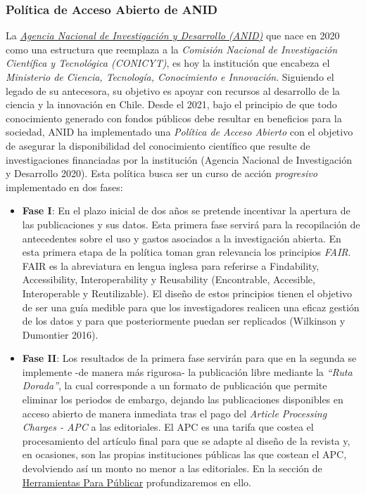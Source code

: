 \documentclass[
  spanish,
  letterpaper,
  DIV=11,
  numbers=noendperiod]{scrreprt}
\begin{document}
\subsubsection*{\texorpdfstring{\textbf{Política de Acceso Abierto de
ANID}}{Política de Acceso Abierto de ANID}}\label{poluxedtica-de-acceso-abierto-de-anid}

La \href{https://www.anid.cl/}{\emph{Agencia Nacional de Investigación y
Desarrollo (ANID)}} que nace en 2020 como una estructura que reemplaza a
la \emph{Comisión Nacional de Investigación Científica y Tecnológica
(CONICYT)}, es hoy la institución que encabeza el \emph{Ministerio de
Ciencia, Tecnología, Conocimiento e Innovación}. Siguiendo el legado de
su antecesora, su objetivo es apoyar con recursos al desarrollo de la
ciencia y la innovación en Chile. Desde el 2021, bajo el principio de
que todo conocimiento generado con fondos públicos debe resultar en
beneficios para la sociedad, ANID ha implementado una \emph{Política de
Acceso Abierto} con el objetivo de asegurar la disponibilidad del
conocimiento científico que resulte de investigaciones financiadas por
la institución (Agencia Nacional de Investigación y Desarrollo 2020).
Esta política busca ser un curso de acción \emph{progresivo}
implementado en dos fases:

\begin{itemize}
\item
  \textbf{Fase I}: En el plazo inicial de dos años se pretende
  incentivar la apertura de las publicaciones y sus datos. Esta primera
  fase servirá para la recopilación de antecedentes sobre el uso y
  gastos asociados a la investigación abierta. En esta primera etapa de
  la política toman gran relevancia los principios \emph{FAIR}. FAIR es
  la abreviatura en lengua inglesa para referirse a Findability,
  Accessibility, Interoperability y Reusability (Encontrable, Accesible,
  Interoperable y Reutilizable). El diseño de estos principios tienen el
  objetivo de ser una guía medible para que los investigadores realicen
  una eficaz gestión de los datos y para que posteriormente puedan ser
  replicados (Wilkinson y Dumontier 2016).
\item
  \textbf{Fase II}: Los resultados de la primera fase servirán para que
  en la segunda se implemente -de manera más rigurosa- la publicación
  libre mediante la \emph{``Ruta Dorada''}, la cual corresponde a un
  formato de publicación que permite eliminar los periodos de embargo,
  dejando las publicaciones disponibles en acceso abierto de manera
  inmediata tras el pago del \emph{Article Processing Charges - APC} a
  las editoriales. El APC es una tarifa que costea el procesamiento del
  artículo final para que se adapte al diseño de la revista y, en
  ocasiones, son las propias instituciones públicas las que costean el
  APC, devolviendo así un monto no menor a las editoriales. En la
  sección de
  \href{https://lisa-coes.github.io/open-access/herramientas-para-publicar.html}{Herramientas
  Para Públicar} profundizaremos en ello.
\end{itemize}
\end{document}
